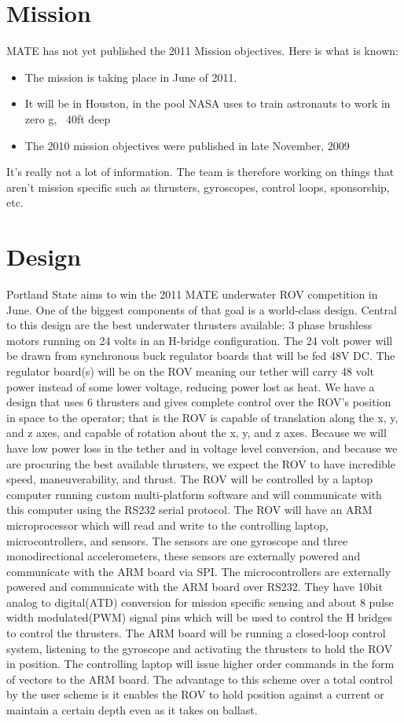 \documentclass{proposalnsf}
\begin{document}
\section{Mission}

MATE has not yet published the 2011 Mission objectives. Here is what is known:
\begin{itemize}
\item The mission is taking place in June of 2011.
\item It will be in Houston, in the pool NASA uses to train astronauts to work in zero g, ~40ft deep
\item The 2010 mission objectives were published in late November, 2009
\end{itemize}
It's really not a lot of information. The team is therefore working on things that aren't mission specific such as thrusters, gyroscopes, control loops, sponsorship, etc.


\section{Design}
Portland State aims to win the 2011 MATE underwater ROV competition in June. One of the biggest components of that goal is a world-class design. Central to this design are the best underwater thrusters available: 3 phase brushless motors running on 24 volts in an H-bridge configuration. The 24 volt power will be drawn from synchronous buck regulator boards that will be fed 48V DC. The regulator board(s) will be on the ROV meaning our tether will carry 48 volt power instead of some lower voltage, reducing power lost as heat. We have a design that uses 6 thrusters and gives complete control over the ROV’s position in space to the operator; that is the ROV is capable of translation along the x, y, and z axes, and capable of rotation about the x, y, and z axes. Because we will have low power loss in the tether and in voltage level conversion, and because we are procuring the best available thrusters, we expect the ROV to have incredible speed, maneuverability, and thrust. The ROV will be controlled by a laptop computer running custom multi-platform software and will communicate with this computer using the RS232 serial protocol. The ROV will have an ARM microprocessor which will read and write to the controlling laptop, microcontrollers, and sensors. The sensors are one gyroscope and three monodirectional accelerometers, these sensors are externally powered and communicate with the ARM board via SPI. The microcontrollers are externally powered and communicate with the ARM board over RS232. They have 10bit analog to digital(ATD) conversion for mission specific sensing and about 8 pulse width modulated(PWM) signal pins which will be used to control the H bridges to control the thrusters. The ARM board will be running a closed-loop control system, listening to the gyroscope and activating the thrusters to hold the ROV in position. The controlling laptop will issue higher order commands in the form of vectors to the ARM board. The advantage to this scheme over a total control by the user scheme is it enables the ROV to hold position against a current or maintain a certain depth even as it takes on ballast.
\end{document}
